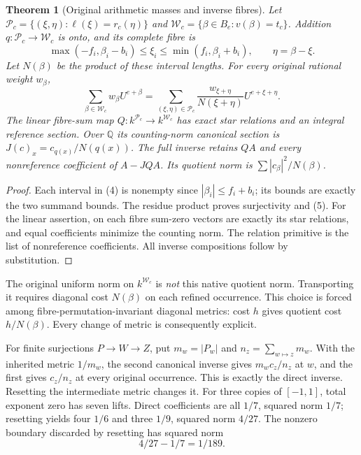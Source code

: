 \documentclass[11pt,a4paper]{article}
\newtheorem{theorem}{Theorem}
\begin{document}
\begin{theorem}[Original arithmetic masses and inverse fibres]
Let $\mathscr P_c=\{(\xi,\eta):\ell(\xi)=r_c(\eta)\}$ and
$\mathscr W_c=\{\beta\in B_e:v(\beta)=t_c\}$.
Addition $q:\mathscr P_c\to\mathscr W_c$ is onto, and its complete fibre is
\[
 \max(-f_i,\beta_i-b_i)\le\xi_i\le\min(f_i,\beta_i+b_i),
 \qquad\eta=\beta-\xi.                                   \tag{4}
\]
Let $N(\beta)$ be the product of these interval lengths.
For every original rational weight $w_\beta$,
\[
 \boxed{\sum_{\beta\in\mathscr W_c}w_\beta U^{e+\beta}
 =\sum_{(\xi,\eta)\in\mathscr P_c}
       \frac{w_{\xi+\eta}}{N(\xi+\eta)}U^{e+\xi+\eta}.}     \tag{5}
\]
The linear fibre-sum map $Q:k^{\mathscr P_c}\to k^{\mathscr W_c}$ has
exact star relations and an integral reference section. Over $\mathbb Q$
its counting-norm canonical section is $J(c)_x=c_{q(x)}/N(q(x))$.
The full inverse retains $QA$ and every nonreference coefficient of
$A-JQA$. Its quotient norm is $\sum|c_\beta|^2/N(\beta)$.
\end{theorem}
\begin{proof}
Each interval in (4) is nonempty since $|\beta_i|\le f_i+b_i$; its
bounds are exactly the two summand bounds. The residue product proves
surjectivity and (5). For the linear assertion, on each fibre sum-zero
vectors are exactly its star relations, and equal coefficients minimize
the counting norm. The relation primitive is the list of nonreference
coefficients. All inverse compositions follow by substitution.
\end{proof}

The original uniform norm on $k^{\mathscr W_c}$ is \emph{not} this native
quotient norm. Transporting it requires diagonal cost $N(\beta)$ on each
refined occurrence. This choice is forced among fibre-permutation-invariant
diagonal metrics: cost $h$ gives quotient cost $h/N(\beta)$.
Every change of metric is consequently explicit.

For finite surjections $P\to W\to Z$, put $m_w=|P_w|$ and
$n_z=\sum_{w\mapsto z}m_w$. With the inherited metric $1/m_w$, the second
canonical inverse gives $m_wc_z/n_z$ at $w$, and the first gives $c_z/n_z$
at every original occurrence. This is exactly the direct inverse. Resetting
the intermediate metric changes it. For three copies of $[-1,1]$, total
exponent zero has seven lifts. Direct coefficients are all $1/7$, squared norm
$1/7$; resetting yields four $1/6$ and three $1/9$, squared norm $4/27$. The
nonzero boundary discarded by resetting has squared norm
\[
 \boxed{4/27-1/7=1/189.}                                  \tag{6}
\]
\end{document}
